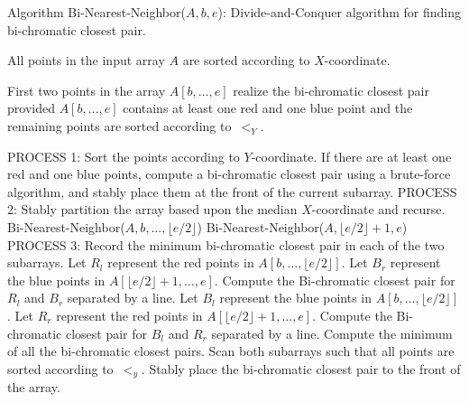 \begin{algorithm} 
  \caption{Algorithm Bi-Nearest-Neighbor($A,b,e$): Divide-and-Conquer algorithm for finding bi-chromatic closest
    pair.}\label{alg:binn}
  \begin{algorithmic}[1]

    \REQUIRE All points in the input array $A$ are sorted according to
    $X$-coordinate.

    \ENSURE First two points in the array $A[b,\ldots,e]$ realize the
    bi-chromatic closest pair provided $A[b,\ldots,e]$ contains at least
    one red and one blue point and the remaining points are sorted
    according to~$<_Y$.

	 \STATE PROCESS 1: Sort the points according to $Y$-coordinate.
	 If there are at least one red and one blue points, compute
	 a bi-chromatic closest pair using a brute-force algorithm,
	 and stably place them at the front of the current subarray.
    \ELSE
         \STATE PROCESS 2: Stably partition the array based upon the median $X$-coordinate and recurse.
         \STATE Bi-Nearest-Neighbor($A,b,\ldots,\lfloor e/2 \rfloor$)
         \STATE Bi-Nearest-Neighbor($A,\lfloor e/2 \rfloor + 1, e$)
         \STATE PROCESS 3: Record the minimum bi-chromatic closest pair in each of the two subarrays.
         \STATE Let $R_l$ represent the red points in $A[b,\ldots,\lfloor e/2 \rfloor]$.
         \STATE Let $B_r$ represent the blue points in $A[\lfloor e/2 \rfloor + 1,\ldots,e]$.
               \STATE Compute the Bi-chromatic closest pair for $R_l$ and $B_r$ separated by a line. 
         \ENDIF
         \STATE Let $B_l$ represent the blue points in $A[b,\ldots,\lfloor e/2 \rfloor]$.
         \STATE Let $R_r$ represent the red points in $A[\lfloor e/2 \rfloor + 1,\ldots,e]$.
               \STATE Compute the Bi-chromatic closest pair for $B_l$ and $R_r$ separated by a line. 
         \ENDIF
         \STATE Compute the minimum of all the bi-chromatic closest pairs.
         \STATE Scan both subarrays such that all points are sorted according to~$<_y$.
         \STATE Stably place the bi-chromatic closest pair to the front of the array.
    \ENDIF
  \end{algorithmic}
\end{algorithm}

